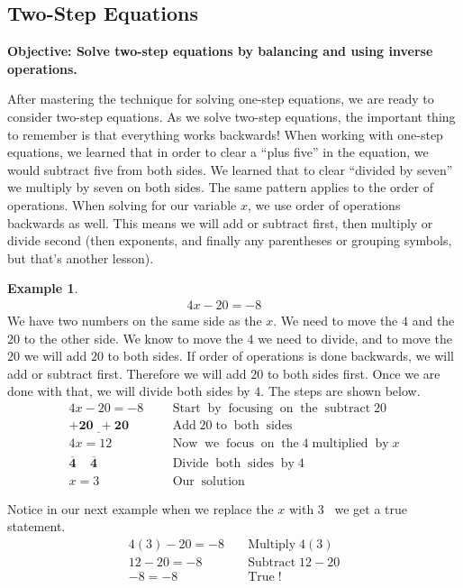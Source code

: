 \documentclass[12pt]{book}
\theoremstyle{definition}
\newtheorem{example}{Example}
\newcommand{\tmmathbf}[1]{\ensuremath{\boldsymbol{#1}}}
\newcommand{\tmop}[1]{\ensuremath{\operatorname{#1}}}
\begin{document}
\subsection{Two-Step Equations}
{\bf Objective: Solve two-step equations by balancing and using inverse operations.}\par
After mastering the technique for solving one-step equations, we are ready to consider two-step equations. As we solve two-step
equations, the important thing to remember is that everything works backwards! When working with one-step equations, we learned that in order to clear a ``plus five'' in the equation, we would subtract five from both sides. We learned that to clear ``divided by seven'' we multiply by seven on both sides. The same pattern applies to the order of operations. When solving for our variable $x$, we use order of operations backwards as well. This means we will add or subtract first, then multiply or divide second (then exponents, and finally any parentheses or grouping symbols, but that's another lesson).
\begin{example}\label{Lin13}
  \begin{eqnarray*}
    4 x - 20 = - 8 &  & 
  \end{eqnarray*}
   We have two numbers on the same side as the $x$. We need to move the $4$ and
  the $20$ to the other side. We know to move the $4$ we need to divide, and
  to move the $20$ we will add $20$ to both sides. If order of operations
  is done backwards, we will add or subtract first. Therefore we will add $20$
  to both sides first. Once we are done with that, we will divide both sides
  by $4$. The steps are shown below.
  \begin{eqnarray*}
    4 x - 20 = - 8~~ &  & \tmop{Start} \tmop{by} \tmop{focusing} \tmop{on}
    \tmop{the} \tmop{subtract} 20\\
    \tmmathbf{\underline{+ 20 ~~+ 20}} &  & \tmop{Add} 20 \tmop{to} \tmop{both}
    \tmop{sides}\\
    4 x = 12~~ &  & \tmop{Now} \tmop{we} \tmop{focus} \tmop{on} \tmop{the} 4
    \tmop{multiplied} \tmop{by} x\\
    \tmmathbf{\overline{4} ~~~~~ \overline{4}~}~ &  & \tmop{Divide} \tmop{both}
    \tmop{sides} \tmop{by} 4\\
    x = 3~~ &  & \tmop{Our} \tmop{solution}
  \end{eqnarray*}
\end{example}
Notice in our next example when we replace the $x$ with $3$ \ we get a true statement.
\begin{eqnarray*}
  4 (3) - 20 = - 8 &  & \tmop{Multiply} 4 (3)\\
  12 - 20 = - 8 &  & \tmop{Subtract} 12 - 20\\
  - 8 = - 8 &  & \tmop{True} !
\end{eqnarray*}
\end{document}
